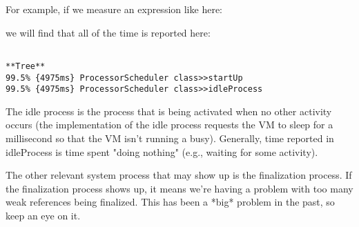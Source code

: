 \documentclass[a4paper,10pt,twoside]{book}
\begin{document}
For example, if we measure an expression like here:


we will find that all of the time is reported here:

\begin{verbatim}

**Tree**
99.5% {4975ms} ProcessorScheduler class>>startUp
99.5% {4975ms} ProcessorScheduler class>>idleProcess
\end{verbatim}

The idle process is the process that is being activated when no other
activity occurs (the implementation of the idle process requests the VM
to sleep for a millisecond so that the VM isn't running a busy).
Generally, time reported in idleProcess is time spent "doing nothing"
(e.g., waiting for some activity).

The other relevant system process that may show up is the finalization
process. If the finalization process shows up, it means we're having a
problem with too many weak references being finalized. This has been a
*big* problem in the past, so keep an eye on it.

\ifx\wholebook\relax\else
\end{document}
